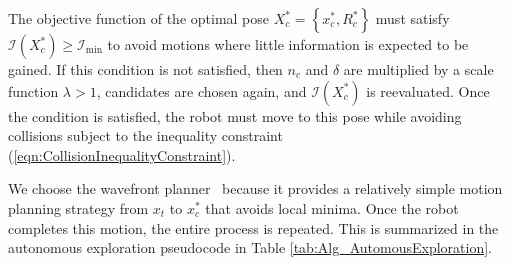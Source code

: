 \documentclass[letterpaper, 10pt]{ieeeconf}
\newcommand{\norm}[1]{\ensuremath{\left\| #1 \right\|}}
\newcommand{\braces}[1]{\ensuremath{\left\{ #1 \right\}}}
\newcommand{\refeqn}[1]{(\ref{eqn:#1})}
\renewcommand{\Re}{\ensuremath{\mathbb{R}}}
\begin{document}
%
%
%

The objective function of the optimal pose $X_c^*=\braces{x_c^*,R_c^*}$ must satisfy $\mathcal I(X_c^*)\geq\mathcal I_\text{min}$ to avoid motions where little information is expected to be gained. 
If this condition is not satisfied, then $n_c$ and $\delta$ are multiplied by a scale function $\lambda>1$, candidates are chosen again, and $\mathcal I(X_c^*)$ is reevaluated.
Once the condition is satisfied, the robot must move to this pose while avoiding collisions subject to the inequality constraint \refeqn{CollisionInequalityConstraint}. 

We choose the wavefront planner~\cite{ZelJarByrYut93} because it provides a relatively simple motion planning strategy from $x_t$ to $x_c^*$ that avoids local minima. Once the robot completes this motion, the entire process is repeated. This is summarized in the autonomous exploration pseudocode in Table \ref{tab:Alg_AutomousExploration}.


\end{document}
